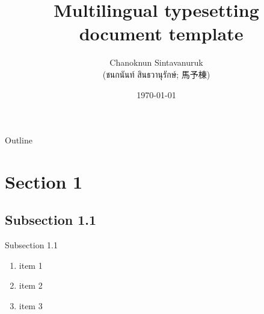 \documentclass[serif]{beamer}
\title{Multilingual typesetting \XeTeX ~document template}
\author[shortname]{Chanoknun Sintavanuruk \\ (ชนกนันท์ สินธวานุรักษ์; 馬予棟) \inst{1}
}
\institute[shortinst]{\inst{1} affiliation
}
\date{\today}
\begin{document}
\begin{frame}
	\titlepage
\end{frame}
\logo{}

\begin{frame}{Outline}
	\tableofcontents
\end{frame}

\section{Section 1}
\subsection{Subsection 1.1}
\begin{frame}{Subsection 1.1}
	\begin{enumerate}
		\item<1-> item 1
		\item<2-> item 2
		\item<3-> item 3
	\end{enumerate}
\end{frame}
\end{document}
